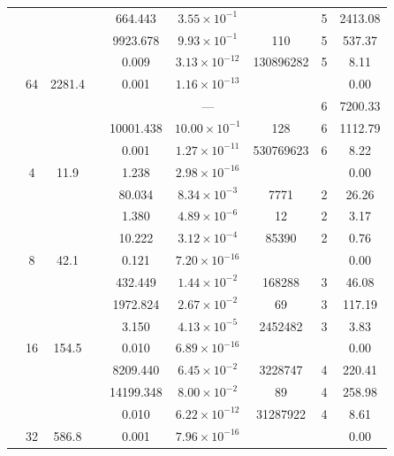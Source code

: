 \begin{table}[htbp]
\begin{tabular}{l S[table-format=3.0] S[table-format=4.1] l S[table-format=3.3] S[table-format=1.2e2] S[table-format=6.0] S[table-format=2.0] S[table-format=4.2]}
     &  &  &  & 664.443 & $3.55 \times 10^{-1}$ & {\text{---}} & 5 & 2413.08 \\
     &  &  &  & 9923.678 & $9.93 \times 10^{-1}$ & 110 & 5 & 537.37 \\
     &  &  &  & 0.009 & $3.13 \times 10^{-12}$ & 130896282 & 5 & 8.11 \\
     & 64 & 2281.4 &  & 0.001 & $1.16 \times 10^{-13}$ & {\text{---}} & {\text{---}} & 0.00 \\
     &  &  &  & {\text{---}} & ${\text{---}}$ & {\text{---}} & 6 & 7200.33 \\
     &  &  &  & 10001.438 & $10.00 \times 10^{-1}$ & 128 & 6 & 1112.79 \\
     &  &  &  & 0.001 & $1.27 \times 10^{-11}$ & 530769623 & 6 & 8.22 \\
    \midrule
     & 4 & 11.9 &  & 1.238 & $2.98 \times 10^{-16}$ & {\text{---}} & {\text{---}} & 0.00 \\
     &  &  &  & 80.034 & $8.34 \times 10^{-3}$ & 7771 & 2 & 26.26 \\
     &  &  &  & 1.380 & $4.89 \times 10^{-6}$ & 12 & 2 & 3.17 \\
     &  &  &  & 10.222 & $3.12 \times 10^{-4}$ & 85390 & 2 & 0.76 \\
     & 8 & 42.1 &  & 0.121 & $7.20 \times 10^{-16}$ & {\text{---}} & {\text{---}} & 0.00 \\
     &  &  &  & 432.449 & $1.44 \times 10^{-2}$ & 168288 & 3 & 46.08 \\
     &  &  &  & 1972.824 & $2.67 \times 10^{-2}$ & 69 & 3 & 117.19 \\
     &  &  &  & 3.150 & $4.13 \times 10^{-5}$ & 2452482 & 3 & 3.83 \\
     & 16 & 154.5 &  & 0.010 & $6.89 \times 10^{-16}$ & {\text{---}} & {\text{---}} & 0.00 \\
     &  &  &  & 8209.440 & $6.45 \times 10^{-2}$ & 3228747 & 4 & 220.41 \\
     &  &  &  & 14199.348 & $8.00 \times 10^{-2}$ & 89 & 4 & 258.98 \\
     &  &  &  & 0.010 & $6.22 \times 10^{-12}$ & 31287922 & 4 & 8.61 \\
     & 32 & 586.8 &  & 0.001 & $7.96 \times 10^{-16}$ & {\text{---}} & {\text{---}} & 0.00 \\

\end{tabular}
\end{table}
